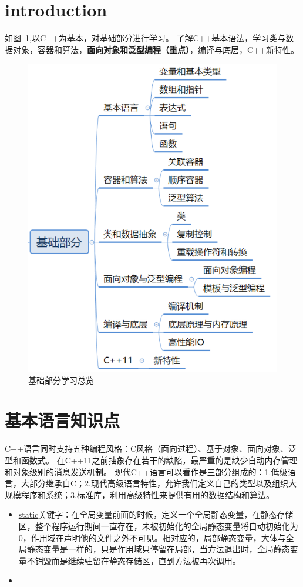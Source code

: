 \section{introduction}

如图~\ref{fig:overview},以C++为基本，对基础部分进行学习。
了解C++基本语法，学习类与数据对象，容器和算法，\textbf{面向对象和泛型编程（重点）}，编译与底层，C++新特性。

\begin{figure}[]
	\centering
	\includegraphics[width=0.5\columnwidth]{pic/overview.png}
	\caption{基础部分学习总览}
	\label{fig:overview}
\end{figure}

\section{基本语言知识点}
C++语言同时支持五种编程风格：C风格（面向过程）、基于对象、面向对象、泛型和函数式。
在C++11之前抽象存在若干的缺陷，最严重的是缺少自动内存管理和对象级别的消息发送机制。
现代C++语言可以看作是三部分组成的：1.低级语言，大部分继承自C；2.现代高级语言特性，允许我们定义自己的类型以及组织大规模程序和系统；3.标准库，利用高级特性来提供有用的数据结构和算法。

\begin{itemize}
	\item \underline{static}关键字：在全局变量前面的时候，定义一个全局静态变量，在静态存储区，整个程序运行期间一直存在，未被初始化的全局静态变量将自动初始化为0，作用域在声明他的文件之外不可见。相对应的，局部静态变量，大体与全局静态变量是一样的，只是作用域只停留在局部，当方法退出时，全局静态变量不销毁而是继续驻留在静态存储区，直到方法被再次调用。
	\item 
\end{itemize}
